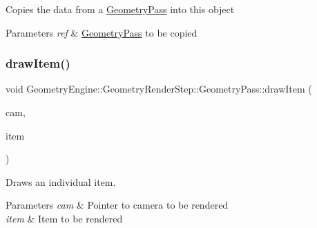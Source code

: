 Copies the data from a \mbox{\hyperlink{class_geometry_engine_1_1_geometry_render_step_1_1_geometry_pass}{Geometry\+Pass}} into this object 
\begin{DoxyParams}{Parameters}
{\em ref} & \mbox{\hyperlink{class_geometry_engine_1_1_geometry_render_step_1_1_geometry_pass}{Geometry\+Pass}} to be copied \\
\hline
\end{DoxyParams}
\mbox{\label{class_geometry_engine_1_1_geometry_render_step_1_1_geometry_pass_a0e3189d5f441ada51ef31e09f100e270}} 
\subsubsection{\texorpdfstring{drawItem()}{drawItem()}}
{\footnotesize\ttfamily void Geometry\+Engine\+::\+Geometry\+Render\+Step\+::\+Geometry\+Pass\+::draw\+Item (\begin{DoxyParamCaption}\item[{\mbox{\hyperlink{class_geometry_engine_1_1_geometry_world_item_1_1_geometry_camera_1_1_camera}{Geometry\+World\+Item\+::\+Geometry\+Camera\+::\+Camera}} $\ast$}]{cam,  }\item[{\mbox{\hyperlink{class_geometry_engine_1_1_geometry_world_item_1_1_geometry_item_1_1_geometry_item}{Geometry\+World\+Item\+::\+Geometry\+Item\+::\+Geometry\+Item}} $\ast$}]{item }\end{DoxyParamCaption})\hspace{0.3cm}{\ttfamily [protected]}}

Draws an individual item. 
\begin{DoxyParams}{Parameters}
{\em cam} & Pointer to camera to be rendered \\
\hline
{\em item} & Item to be rendered \\
\hline
\end{DoxyParams}
\mbox{\label{class_geometry_engine_1_1_geometry_render_step_1_1_geometry_pass_a7ffab46f648d6a501218086039bb0ab4}} 
